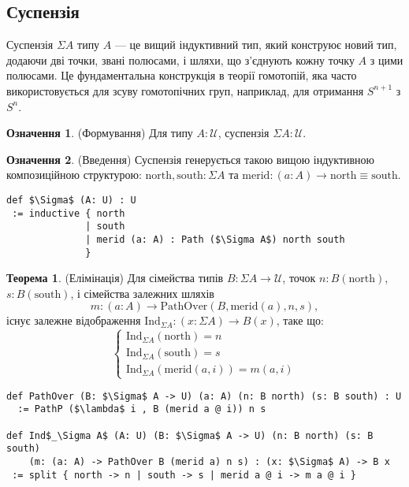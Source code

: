 \documentclass{article}
\theoremstyle{definition}
\newtheorem{theorem}{Теорема}
\newtheorem{definition}{Означення}
\begin{document}
\newpage
\subsection{Суспензія}
Суспензія \(\Sigma A\) типу \( A \) — це вищий індуктивний тип, який
конструює новий тип, додаючи дві точки, звані полюсами, і шляхи, що з’єднують
кожну точку \( A \) з цими полюсами. Це фундаментальна конструкція в теорії гомотопій,
яка часто використовується для зсуву гомотопічних груп, наприклад, для отримання \( S^{n+1} \) з \( S^n \).

\begin{definition} (Формування)
Для типу \( A : \mathcal{U} \), суспензія \( \Sigma A : \mathcal{U} \).
\end{definition}

\begin{definition} (Введення)
Суспензія генерується такою вищою індуктивною композиційною структурою:
\( \text{north}, \text{south} : \Sigma A \) та \( \text{merid} : (a : A) \to \text{north} \equiv \text{south} \).
\begin{lstlisting}[mathescape=true]
def $\Sigma$ (A: U) : U
 := inductive { north
              | south
              | merid (a: A) : Path ($\Sigma A$) north south
              }
\end{lstlisting}
\end{definition}

\begin{theorem} (Елімінація)
Для сімейства типів \( B : \Sigma A \to \mathcal{U} \), точок \( n : B(\text{north}) \), \( s : B(\text{south}) \), і сімейства
залежних шляхів
\[
  m : (a : A) \to \text{PathOver}(B,\text{merid}(a),n,s),
\]
існує залежне відображення \( \text{Ind}_{\Sigma A} : (x : \Sigma A) \to B(x) \), таке що:
\[
\begin{cases}
\text{Ind}_{\Sigma A}(\text{north}) = n \\
\text{Ind}_{\Sigma A}(\text{south}) = s \\
\text{Ind}_{\Sigma A}(\text{merid}(a,i)) = m(a,i)
\end{cases}
\]
\begin{lstlisting}[mathescape=true]
def PathOver (B: $\Sigma$ A -> U) (a: A) (n: B north) (s: B south) : U
  := PathP ($\lambda$ i , B (merid a @ i)) n s

def Ind$_\Sigma A$ (A: U) (B: $\Sigma$ A -> U) (n: B north) (s: B south)
    (m: (a: A) -> PathOver B (merid a) n s) : (x: $\Sigma$ A) -> B x
 := split { north -> n | south -> s | merid a @ i -> m a @ i }
\end{lstlisting}
\end{theorem}
\end{document}
